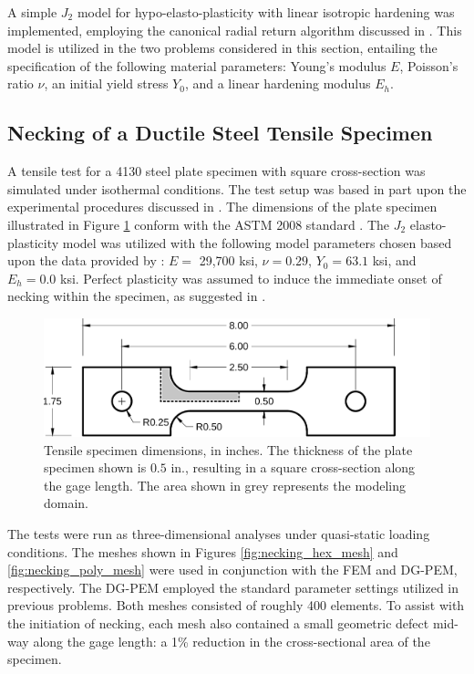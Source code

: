 A simple $J_2$ model for hypo-elasto-plasticity with linear isotropic hardening was implemented, employing the canonical radial return algorithm discussed in \cite{LSDYNA}. This model is utilized in the two problems considered in this section, entailing the specification of the following material parameters: Young's modulus $E$, Poisson's ratio $\nu$, an initial yield stress $Y_0$, and a linear hardening modulus $E_h$.

\subsection*{Necking of a Ductile Steel Tensile Specimen}

A tensile test for a 4130 steel plate specimen with square cross-section was simulated under isothermal conditions. The test setup was based in part upon the experimental procedures discussed in \cite{Gerberich:62}. The dimensions of the plate specimen illustrated in Figure \ref{fig:tensile_specimen_dimensions} conform with the ASTM 2008 standard \cite{ASTM:08}. The $J_2$ elasto-plasticity model was utilized with the following model parameters chosen based upon the data provided by \cite{ASM:18}: $E =$ 29,700 ksi, $\nu = 0.29$, $Y_0 = 63.1$ ksi, and $E_h = 0.0$ ksi. Perfect plasticity was assumed to induce the immediate onset of necking within the specimen, as suggested in \cite{Kim:05}.

\begin{figure}[!h]
  \centering
  \includegraphics[width=6.0in]{figures/tensile_specimen_dimensions.pdf}
  \caption{Tensile specimen dimensions, in inches. The thickness of the plate specimen shown is $0.5$ in., resulting in a square cross-section along the gage length. The area shown in grey represents the modeling domain.}
  \label{fig:tensile_specimen_dimensions}
\end{figure}

The tests were run as three-dimensional analyses under quasi-static loading conditions. The meshes shown in Figures \ref{fig:necking_hex_mesh} and \ref{fig:necking_poly_mesh} were used in conjunction with the FEM and DG-PEM, respectively. The DG-PEM employed the standard parameter settings utilized in previous problems. Both meshes consisted of roughly 400 elements. To assist with the initiation of necking, each mesh also contained a small geometric defect mid-way along the gage length: a 1\% reduction in the cross-sectional area of the specimen.


